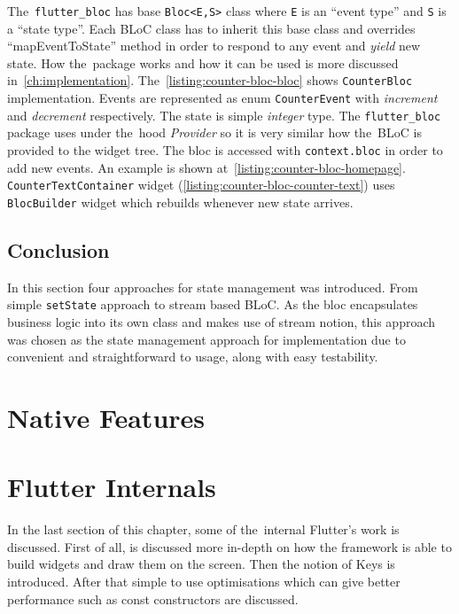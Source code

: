 The~\verb|flutter_bloc| has base \verb|Bloc<E,S>| class where \verb|E| is an ``event type'' and \verb|S| is a ``state type''. Each BLoC class has to inherit this base class and overrides ``mapEventToState'' method in order to respond to any event and \textit{yield} new state. How the~package works and how it can be used is more discussed in~\cref{ch:implementation}. The~\cref{listing:counter-bloc-bloc} shows \verb|CounterBloc| implementation. Events are represented as enum \verb|CounterEvent| with \textit{increment} and \textit{decrement} respectively. The state is simple \textit{integer} type. The \verb|flutter_bloc| package uses under the~hood \textit{Provider} so it is very similar how the~BLoC is provided to the widget tree. The bloc is accessed with \verb|context.bloc| in order to add new events. An example is shown at~\cref{listing:counter-bloc-homepage}.  \verb|CounterTextContainer| widget (\cref{listing:counter-bloc-counter-text}) uses \verb|BlocBuilder| widget which rebuilds whenever new state arrives. 
\subsection{Conclusion}
In this section four approaches for state management was introduced. From simple \verb|setState| approach to stream based BLoC. As the bloc encapsulates business logic into its own class and makes use of stream notion, this approach was chosen as the state management approach for implementation due to convenient and straightforward to usage, along with easy testability.
\section{Native Features}
\section{Flutter Internals}
In the last section of this chapter, some of the~internal Flutter's work is discussed. First of all, is discussed more in-depth on how the framework is able to build widgets and draw them on the screen. Then the notion of Keys is introduced. After that simple to use optimisations which can give better performance such as const constructors are discussed. 

